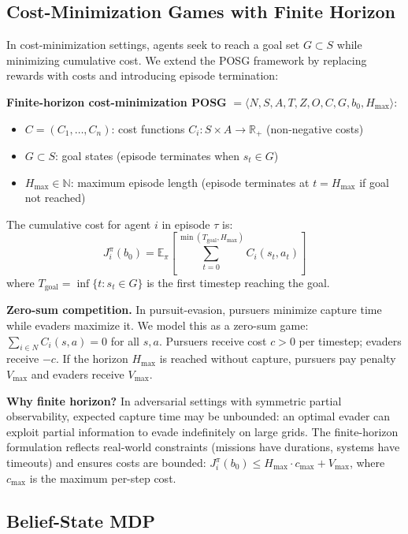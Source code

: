\documentclass{article}
\begin{document}
\subsection{Cost-Minimization Games with Finite Horizon}

In cost-minimization settings, agents seek to reach a goal set $G \subset S$ while minimizing cumulative cost. We extend the POSG framework by replacing rewards with costs and introducing episode termination:

\textbf{Finite-horizon cost-minimization POSG} $= \langle N, S, A, T, Z, O, C, G, b_0, H_{\max} \rangle$:

\begin{itemize}
    \item $C = (C_1, \ldots, C_n)$: cost functions $C_i: S \times A \to \mathbb{R}_+$ (non-negative costs)
    \item $G \subset S$: goal states (episode terminates when $s_t \in G$)
    \item $H_{\max} \in \mathbb{N}$: maximum episode length (episode terminates at $t = H_{\max}$ if goal not reached)
\end{itemize}

The cumulative cost for agent $i$ in episode $\tau$ is:
\begin{equation}
J_i^\pi(b_0) = \mathbb{E}_\pi \left[ \sum_{t=0}^{\min(T_{\text{goal}}, H_{\max})} C_i(s_t, a_t) \right]
\end{equation}
where $T_{\text{goal}} = \inf\{t : s_t \in G\}$ is the first timestep reaching the goal.

\textbf{Zero-sum competition.} In pursuit-evasion, pursuers minimize capture time while evaders maximize it. We model this as a zero-sum game: $\sum_{i \in N} C_i(s,a) = 0$ for all $s,a$. Pursuers receive cost $c > 0$ per timestep; evaders receive $-c$. If the horizon $H_{\max}$ is reached without capture, pursuers pay penalty $V_{\max}$ and evaders receive $V_{\max}$.

\textbf{Why finite horizon?} In adversarial settings with symmetric partial observability, expected capture time may be unbounded: an optimal evader can exploit partial information to evade indefinitely on large grids. The finite-horizon formulation reflects real-world constraints (missions have durations, systems have timeouts) and ensures costs are bounded: $J_i^\pi(b_0) \leq H_{\max} \cdot c_{\max} + V_{\max}$, where $c_{\max}$ is the maximum per-step cost.

\subsection{Belief-State MDP}
\end{document}
